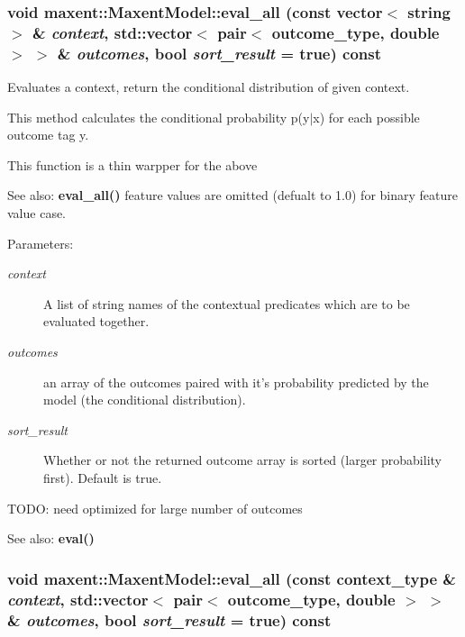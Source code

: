 \subsubsection{\setlength{\rightskip}{0pt plus 5cm}void maxent::Maxent\-Model::eval\_\-all (const vector$<$ string $>$ \& {\em context}, std::vector$<$ pair$<$ outcome\_\-type, double $>$ $>$ \& {\em outcomes}, bool {\em sort\_\-result} = true) const}\label{classmaxent_1_1MaxentModel_a12}


Evaluates a context, return the conditional distribution of given context. 

This method calculates the conditional probability p(y$|$x) for each possible outcome tag y.

This function is a thin warpper for the above \begin{Desc}
\item[See also:]{\bf eval\_\-all()} feature values are omitted (defualt to 1.0) for binary feature value case.\end{Desc}
\begin{Desc}
\item[Parameters:]
\begin{description}
\item[{\em context}]A list of string names of the contextual predicates which are to be evaluated together. \item[{\em outcomes}]an array of the outcomes paired with it's probability predicted by the model (the conditional distribution). \item[{\em sort\_\-result}]Whether or not the returned outcome array is sorted (larger probability first). Default is true.\end{description}
\end{Desc}
TODO: need optimized for large number of outcomes

\begin{Desc}
\item[See also:]{\bf eval()} \end{Desc}
\subsubsection{\setlength{\rightskip}{0pt plus 5cm}void maxent::Maxent\-Model::eval\_\-all (const context\_\-type \& {\em context}, std::vector$<$ pair$<$ outcome\_\-type, double $>$ $>$ \& {\em outcomes}, bool {\em sort\_\-result} = true) const}\label{classmaxent_1_1MaxentModel_a4}


